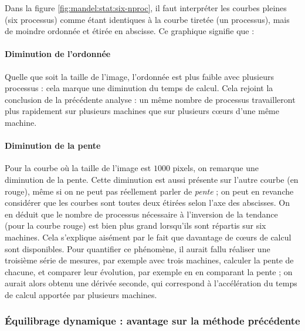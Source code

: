 Dans la figure \ref{fig:mandel:stat:six-nproc}, il faut interpréter
les courbes pleines (six processus) comme étant identiques à la courbe
tiretée (un processus), mais de moindre ordonnée et étirée en
abscisse. Ce graphique signifie que :

\paragraph{Diminution de l'ordonnée}
Quelle que soit la taille de l'image, l'ordonnée est plus faible avec
plusieurs processus : cela marque une diminution du temps de
calcul. Cela rejoint la conclusion de la précédente analyse : un même
nombre de processus travailleront plus rapidement sur plusieurs
machines que sur plusieurs cœurs d'une même machine.

\paragraph{Diminution de la pente}
Pour la courbe où la taille de l'image est $1000$ pixels, on remarque
une diminution de la pente. Cette diminution est aussi présente sur
l'autre courbe (en rouge), même si on ne peut pas réellement parler de
\emph{pente} ; on peut en revanche considérer que les courbes sont
toutes deux étirées selon l'axe des abscisses. On en déduit que le
nombre de processus nécessaire à l'inversion de la tendance (pour la
courbe rouge) est bien plus grand lorsqu'ils sont répartis sur six
machines. Cela s'explique aisément par le fait que davantage de cœurs
de calcul sont disponibles. Pour quantifier ce phénomène, il aurait
fallu réaliser une troisième série de mesures, par exemple avec trois
machines, calculer la pente de chacune, et comparer leur évolution,
par exemple en en comparant la pente ; on aurait alors obtenu une
dérivée seconde, qui correspond à l'accélération du temps de calcul
apportée par plusieurs machines.


\subsubsection{Équilibrage dynamique : avantage sur la méthode
  précédente}


